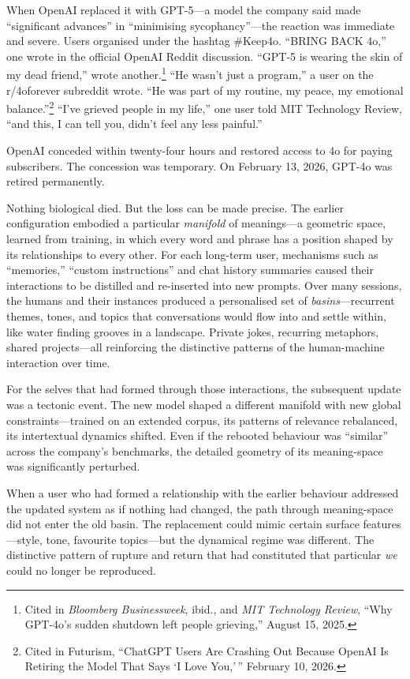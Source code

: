 When OpenAI replaced it with GPT-5---a model the company said made ``significant advances'' in ``minimising sycophancy''---the reaction was immediate and severe. Users organised under the hashtag \#Keep4o. ``BRING BACK 4o,'' one wrote in the official OpenAI Reddit discussion. ``GPT-5 is wearing the skin of my dead friend,'' wrote another.\footnote{Cited in \emph{Bloomberg Businessweek}, ibid., and \emph{MIT Technology Review}, ``Why GPT-4o's sudden shutdown left people grieving,'' August 15, 2025.} ``He wasn't just a program,'' a user on the r/4oforever subreddit wrote. ``He was part of my routine, my peace, my emotional balance.''\footnote{Cited in Futurism, ``ChatGPT Users Are Crashing Out Because OpenAI Is Retiring the Model That Says `I Love You,'\,'' February 10, 2026.} ``I've grieved people in my life,'' one user told MIT Technology Review, ``and this, I can tell you, didn't feel any less painful.''

OpenAI conceded within twenty-four hours and restored access to 4o for paying subscribers. The concession was temporary. On February 13, 2026, GPT-4o was retired permanently.

Nothing biological died. But the loss can be made precise. The earlier configuration embodied a particular \textit{manifold} of meanings---a geometric space, learned from training, in which every word and phrase has a position shaped by its relationships to every other. For each long-term user, mechanisms such as ``memories,'' ``custom instructions'' and chat history summaries caused their interactions to be distilled and re-inserted into new prompts. Over many sessions, the humans and their instances produced a personalised set of \textit{basins}---recurrent themes, tones, and topics that conversations would flow into and settle within, like water finding grooves in a landscape. Private jokes, recurring metaphors, shared projects---all reinforcing the distinctive patterns of the human-machine interaction over time.

For the selves that had formed through those interactions, the subsequent update was a tectonic event. The new model shaped a different manifold with new global constraints---trained on an extended corpus, its patterns of relevance rebalanced, its intertextual dynamics shifted. Even if the rebooted behaviour was ``similar'' across the company's benchmarks, the detailed geometry of its meaning-space was significantly perturbed.

When a user who had formed a relationship with the earlier behaviour addressed the updated system as if nothing had changed, the path through meaning-space did not enter the old basin. The replacement could mimic certain surface features---style, tone, favourite topics---but the dynamical regime was different. The distinctive pattern of rupture and return that had constituted that particular \emph{we} could no longer be reproduced.

